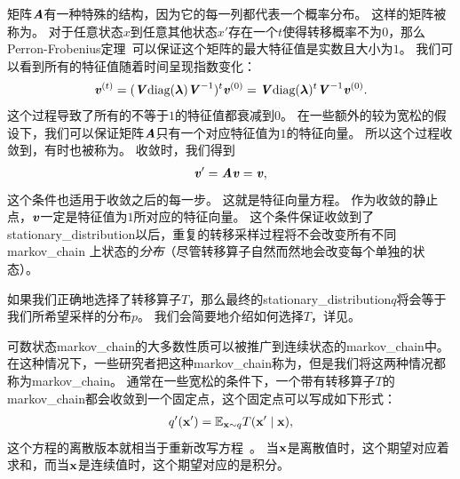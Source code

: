 矩阵$\boldsymbol{\mathit{A}}$有一种特殊的结构，因为它的每一列都代表一个概率分布。
这样的矩阵被称为。
对于任意状态$x$到任意其他状态$x'$存在一个$t$使得转移概率不为$0$，那么Perron-Frobenius定理~\citep{perron1907theorie,frobenius1908matrizen}可以保证这个矩阵的最大特征值是实数且大小为$1$。
我们可以看到所有的特征值随着时间呈现指数变化： 
\begin{align}
\boldsymbol{\mathit{v}}^{(t)} = (\boldsymbol{\mathit{V}} \text{diag}(\boldsymbol{\lambda})\boldsymbol{\mathit{V}}^{-1})^{t} \boldsymbol{\mathit{v}}^{(0)} = \boldsymbol{\mathit{V}} \text{diag}(\boldsymbol{\lambda})^t \boldsymbol{\mathit{V}}^{-1} \boldsymbol{\mathit{v}}^{(0)}.
\end{align}
这个过程导致了所有的不等于$1$的特征值都衰减到$0$。  
在一些额外的较为宽松的假设下，我们可以保证矩阵$\boldsymbol{\mathit{A}}$只有一个对应特征值为$1$的特征向量。  
所以这个过程收敛到，有时也被称为。 
收敛时，我们得到 
\begin{align}
\label{eqn:1723}
\boldsymbol{\mathit{v}} ' = \boldsymbol{\mathit{A}} \boldsymbol{\mathit{v}} = \boldsymbol{\mathit{v}},
\end{align}
这个条件也适用于收敛之后的每一步。
这就是特征向量方程。
作为收敛的静止点，$\boldsymbol{\mathit{v}}$一定是特征值为$1$所对应的特征向量。   %
这个条件保证收敛到了\gls{stationary_distribution}以后，重复的转移采样过程将不会改变所有不同\gls{markov_chain}   上状态的\emph{分布}（尽管转移算子自然而然地会改变每个单独的状态）。  


如果我们正确地选择了转移算子$T$，那么最终的\gls{stationary_distribution}$q$将会等于我们所希望采样的分布$p$。  
我们会简要地介绍如何选择$T$，详见。 


可数状态\gls{markov_chain}的大多数性质可以被推广到连续状态的\gls{markov_chain}中。 
在这种情况下，一些研究者把这种\gls{markov_chain}称为，但是我们将这两种情况都称为\gls{markov_chain}。
通常在一些宽松的条件下，一个带有转移算子$T$的\gls{markov_chain}都会收敛到一个固定点，这个固定点可以写成如下形式：
\begin{align}
q' (\mathbf{x}') = \mathbb{E}_{\mathbf{x}\sim q}T(\mathbf{x}'\mid \mathbf{x}),
\end{align}
这个方程的离散版本就相当于重新改写方程~。
当$\mathbf{x}$是离散值时，这个期望对应着求和，而当$\mathbf{x}$是连续值时，这个期望对应的是积分。 


